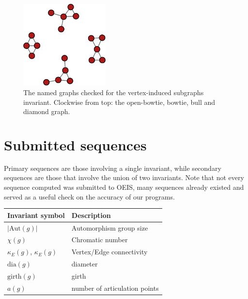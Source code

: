 \documentclass[12pt]{article}
\begin{document}
\begin{appendices}
\begin{figure}[h]
  \includegraphics[width=0.4\textwidth]{simple_drawings/combined_subgraphs.png}
  \caption{The named graphs checked for the vertex-induced subgraphs invariant. Clockwise from top: the open-bowtie, bowtie, bull and diamond graph.}
  \label{fig:namedgraphs}
\end{figure}

\section{Submitted sequences}
\label{app:submittedseq}

Primary sequences are those involving a single invariant, while secondary sequences are those that involve the union of two invariants.
Note that not every sequence computed was submitted to OEIS, many sequences already existed and served as a useful check on the accuracy of our programs.

\newcommand{\VARautomorphismgroupn}{| \text{Aut}(g) |}
\newcommand{\VARchromaticnumber}{\chi(g)}
\newcommand{\VARedgeconnectivity}{\kappa_{E}(g)}
\newcommand{\VARvertexconnectivity}{\kappa_{V}(g)}
\newcommand{\VARdiameter}{\text{dia}(g)}
\newcommand{\VARgirth}{\text{girth}(g)}
\newcommand{\VARnarticulationpoints}{a(g)}

\newcommand{\VARsubgraphfree}[1]{g)}

\begin{longtable}{ l l}
\toprule
Invariant symbol & Description \\
\midrule
$\VARautomorphismgroupn$ & Automorphism group size \\
$\VARchromaticnumber$ & Chromatic number \\
$\VARedgeconnectivity$, $\VARedgeconnectivity$ & Vertex/Edge connectivity \\
$\VARdiameter$ & diameter \\
$\VARgirth$ & girth \\
$\VARnarticulationpoints$ & number of articulation points \\
\end{longtable}


\end{appendices}
\end{document}

